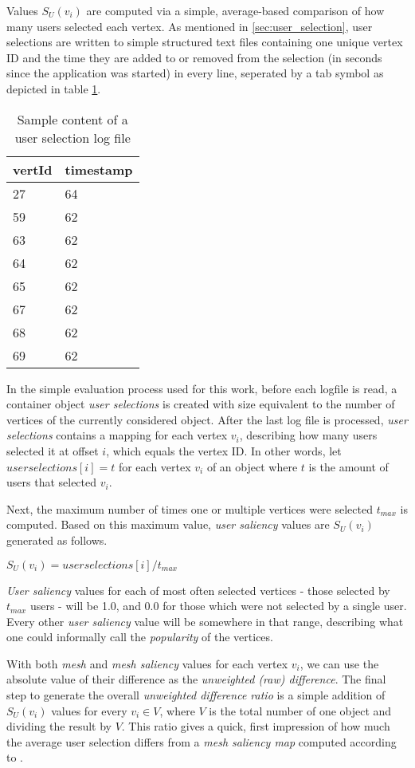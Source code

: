 Values $S_{U}(v_i)$ are computed via a simple, average-based comparison of how many users selected each vertex. As mentioned in \ref{sec:user_selection}, user selections are written to simple structured text files containing one unique vertex ID and the time they are added to or removed from the selection (in seconds since the application was started) in every line, seperated by a tab symbol as depicted in table \ref{tab:user_selection_log_file}.

\begin{table}[]
\centering
	\begin{tabular}{l|l}
	vertId & timestamp \\ \hline
	27 & 64 \\
	59 & 62 \\
	63 & 62 \\
	64 & 62 \\
	65 & 62 \\
	67 & 62 \\
	68 & 62 \\
	69 & 62
	\end{tabular}
	\caption{Sample content of a user selection log file}
	\label{tab:user_selection_log_file}
\end{table}

In the simple evaluation process used for this work, before each logfile is read, a container object \textit{user selections} is created with size equivalent to the number of vertices of the currently considered object. After the last log file is processed, \textit{user selections} contains a mapping for each vertex $v_i$, describing how many users selected it at offset $i$, which equals the vertex ID. In other words, let $userselections[i] = t$ for each vertex $v_i$ of an object where $t$ is the amount of users that selected $v_i$.

Next, the maximum number of times one or multiple vertices were selected $t_{max}$ is computed. Based on this maximum value, \textit{user saliency} values are $S_{U}(v_i)$ generated as follows.

$S_{U}(v_i) = userselections[i]/t_{max}$

\textit{User saliency} values for each of most often selected vertices - those selected by $t_{max}$ users - will be 1.0, and 0.0 for those which were not selected by a single user. Every other \textit{user saliency} value will be somewhere in that range, describing what one could informally call the \textit{popularity} of the vertices.

With both \textit{mesh} and \textit{mesh saliency} values for each vertex $v_i$, we can use the absolute value of their difference as the \textit{unweighted (raw) difference}. The final step to generate the overall \textit{unweighted difference ratio} is a simple addition of $S_{U}(v_i)$ values for every $v_i \in V$, where $V$ is the total number of one object and dividing the result by $V$. This ratio gives a quick, first impression of how much the average user selection differs from a \textit{mesh saliency map} computed according to \cite{lee2005mesh}.

